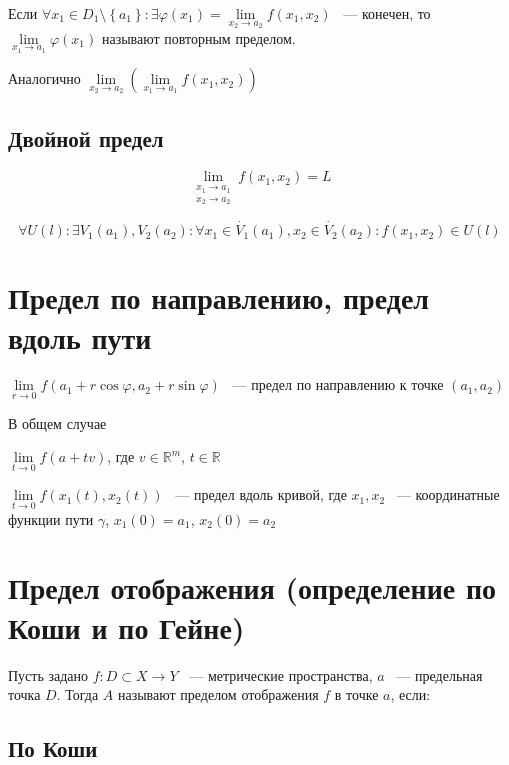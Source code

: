 \documentclass{article}
\begin{document}
            Если $\forall x_1 \in D_1 \setminus \left\{ a_1 \right\} : \exists \varphi(x_1) = \lim\limits_{x_2 \rightarrow a_2} f(x_1, x_2)$ ~--- конечен, то $\lim\limits_{x_1 \rightarrow a_1} \varphi(x_1)$ называют повторным пределом.
        
            Аналогично $\lim\limits_{x_2 \rightarrow a_2} \left(\lim\limits_{x_1 \rightarrow a_1} f(x_1, x_2) \right)$
            
        \subsection{Двойной предел}
        
            $$\lim_{\substack{x_1 \rightarrow a_1 \\ x_2 \rightarrow a_2 }} f(x_1, x_2) = L$$
            
            $$\forall U(l) : \exists V_1(a_1), V_2(a_2) : \forall x_1 \in \dot{V_1}(a_1), x_2 \in \dot{V_2}(a_2) : f(x_1, x_2) \in U(l)$$
            
    \newpage
    
    \section{Предел по направлению, предел вдоль пути}
    
        $\lim\limits_{r \rightarrow 0} f(a_1 + r \cos{\varphi}, a_2 + r \sin{\varphi})$ ~--- предел по направлению к точке $(a_1, a_2)$
        
        В общем случае 
        
        $\lim\limits_{t \rightarrow 0} f(a + tv)$, где $v \in \mathbb{R}^m$, $t \in \mathbb{R}$
        
        $\lim\limits_{t \rightarrow 0} f(x_1(t), x_2(t))$ ~--- предел вдоль кривой, где $x_1, x_2$ ~--- координатные функции пути $\gamma$, $x_1(0) = a_1$, $x_2(0) = a_2$
        
    \newpage
    
    \section{Предел отображения (определение по Коши и по Гейне)}
    
        Пусть задано $f : D \subset X \rightarrow Y$ ~--- метрические пространства, $a$ ~--- предельная точка $D$. Тогда $A$ называют пределом отображения $f$ в точке $a$, если:
        
        \subsection{По Коши}
        
\end{document}
